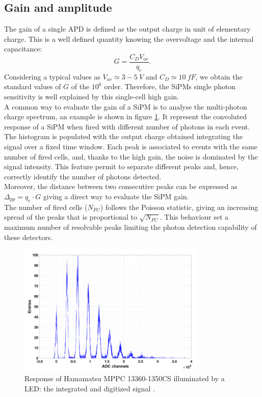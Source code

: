 \subsection*{Gain and amplitude}
The gain of a single APD is defined as the output charge in unit of elementary charge. This is a well defined quantity knowing the overvoltage and the internal capacitance:
\begin{equation}
    G = \frac{C_D V_{ov}}{q_e}.
\end{equation}
Considering a typical values as $V_{ov} \simeq 3-5\ V$ and $C_D \simeq 10\ fF$, we obtain the standard values of $G$ of the $10^6$ order. 
Therefore, the SiPMs single photon sensitivity is well explained by this single-cell high gain.\\
A common way to evaluate the gain of a SiPM is to analyse the multi-photon charge spectrum, an example is shown in figure \ref{fig:MPCS}.
It represent the convoluted response of a SiPM when fired with different number of photons in each event. The histogram is populated with the output charge obtained integrating the signal over a fixed time window.
Each peak is associated to events with the same number of fired cells, and, thanks to the high gain, the noise is dominated by the signal intensity. This feature permit to separate different peaks and, hence, correctly identify the number of photons detected.\\
Moreover, the distance between two consecutive peaks can be expressed as $\Delta_{pp} = q_e \cdot G$ giving a direct way to evaluate the SiPM gain.\\
The number of fired cells ($N_{FC}$) follows the Poisson statistic, giving an increasing spread of the peaks that is proportional to $\sqrt{N_{FC}}$. This behaviour set a maximum number of resolvable peaks limiting the photon detection capability of these detectors.

\begin{figure}
	\centering
	\includegraphics[width=0.8\textwidth]{IMG/Cap3/MPCS.png}
	\caption{Response of Hamamatsu MPPC 13360-1350CS illuminated by a LED: the integrated and digitized signal \cite{MPCS}.}
	\label{fig:MPCS}
\end{figure}

